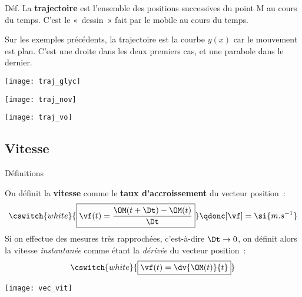 \documentclass[../main/main.tex]{subfiles}
\begin{document}

\begin{rdefi}{Déf.}
    La \textbf{trajectoire} est l'ensemble des positions successives du point M
    au cours du temps. C'est le «~dessin~» fait par le mobile au cours du temps.
\end{rdefi}

Sur les exemples précédents, la trajectoire est la courbe $y(x)$ car le
mouvement est plan. C'est une droite dans les deux premiers cas, et une parabole
dans le dernier. \bigbreak

\begin{minipage}{0.31\linewidth}
    \begin{center}
        \texttt{[image: traj\_glyc]}
    \end{center}
\end{minipage}
\hfill
\begin{minipage}{0.31\linewidth}
    \begin{center}
        \texttt{[image: traj\_nov]}
    \end{center}
\end{minipage}
\hfill
\begin{minipage}{0.31\linewidth}
    \begin{center}
        \texttt{[image: traj\_vo]}
    \end{center}
\end{minipage}

\vspace{-10pt}
\subsection{Vitesse}
\begin{bdefi}{Définitions}
    \begin{minipage}{0.70\linewidth}
        On définit la \textbf{vitesse} comme le \textbf{taux d'accroissement} du
        vecteur position~:
        \[\cswitch{white}{\boxed{\vf(t) = \frac{\OM(t+\Dt) - \OM(t)}{\Dt}}}
        \qdonc
        [\vf] = \si{m.s^{-1}}\]
        Si on effectue des mesures très rapprochées, c'est-à-dire $\Dt \rightarrow
        0$, on définit alors la vitesse \textit{instantanée} comme étant la
        \textit{dérivée} du vecteur position~:
        \[\cswitch{white}{\boxed{\vf(t) = \dv{\OM(t)}{t}}}\]
    \end{minipage}
    \hfill
    \begin{minipage}{0.29\linewidth}
        \begin{center}
            \texttt{[image: vec\_vit]}
        \end{center}
    \end{minipage}
\end{bdefi}
\end{document}
